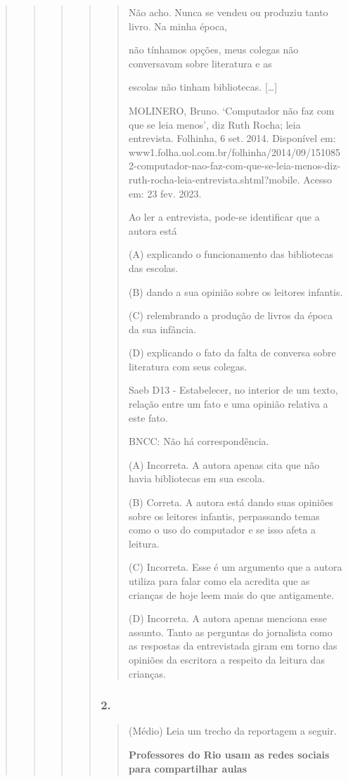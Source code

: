 \begin{quote}
\begin{quote}
\begin{quote}
\begin{quote}
\begin{quote}
Não acho. Nunca se vendeu ou produziu tanto livro. Na minha época,

não tínhamos opções, meus colegas não conversavam sobre literatura e as

escolas não tinham bibliotecas. {[}\ldots{}{]}

MOLINERO, Bruno. `Computador não faz com que se leia menos', diz Ruth
Rocha; leia entrevista. Folhinha, 6 set. 2014. Disponível em:
www1.folha.uol.com.br/folhinha/2014/09/1510852-computador-nao-faz-com-que-se-leia-menos-diz-ruth-rocha-leia-entrevista.shtml?mobile.
Acesso em: 23 fev. 2023.

Ao ler a entrevista, pode-se identificar que a autora está

(A) explicando o funcionamento das bibliotecas das escolas.

(B) dando a sua opinião sobre os leitores infantis.

(C) relembrando a produção de livros da época da sua infância.

(D) explicando o fato da falta de conversa sobre literatura com seus
colegas.

Saeb D13 - Estabelecer, no interior de um texto, relação entre um fato e
uma opinião relativa a este fato.

BNCC: Não há correspondência.

(A) Incorreta. A autora apenas cita que não havia bibliotecas em sua
escola.

(B) Correta. A autora está dando suas opiniões sobre os leitores
infantis, perpassando temas como o uso do computador e se isso afeta a
leitura.

(C) Incorreta. Esse é um argumento que a autora utiliza para falar como
ela acredita que as crianças de hoje leem mais do que antigamente.

(D) Incorreta. A autora apenas menciona esse assunto. Tanto as perguntas
do jornalista como as respostas da entrevistada giram em torno das
opiniões da escritora a respeito da leitura das crianças.
\end{quote}

\subsubsection{2. }\label{section-64}

\begin{quote}
(Médio) Leia um trecho da reportagem a seguir.

\textbf{Professores do Rio usam as redes sociais para compartilhar
aulas}


\end{quote}
\end{quote}
\end{quote}
\end{quote}
\end{quote}
